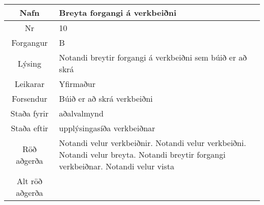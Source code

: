 \documentclass[a4paper]{article}
\begin{document}
\begin{tabular}{|c|p{10cm}|}
\hline
Nafn&Breyta forgangi á verkbeiðni\\
\hline
Nr&10\\
\hline
Forgangur&B\\
\hline
Lýsing&Notandi breytir forgangi á verkbeiðni sem búið er að skrá\\
\hline
Leikarar&Yfirmaður\\
\hline
Forsendur&Búið er að skrá verkbeiðni\\
\hline
Staða fyrir&aðalvalmynd\\
\hline
Staða eftir&upplýsingasíða verkbeiðnar\\
\hline
Röð aðgerða&Notandi velur verkbeiðnir. Notandi velur verkbeiðni. Notandi velur breyta. Notandi breytir forgangi verkbeiðnar. Notandi velur vista\\
\hline
Alt röð aðgerða&\\
\hline
\end{tabular}
\end{document}
